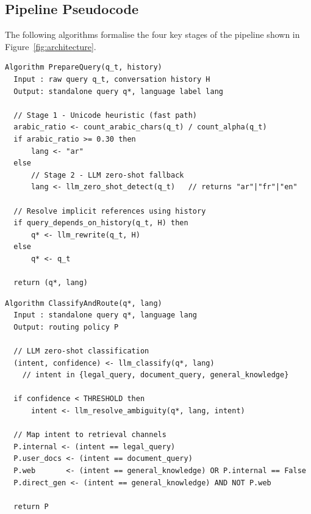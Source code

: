 \documentclass[12pt, a4paper]{article}
\begin{document}
\subsection{Pipeline Pseudocode}
\label{sec:pseudocode}

The following algorithms formalise the four key stages of the pipeline shown
in Figure~\ref{fig:architecture}.

\begin{lstlisting}[caption={Stage 1 --- Language detection and query preparation.},
                   label={lst:prep}, language={}]
Algorithm PrepareQuery(q_t, history)
  Input : raw query q_t, conversation history H
  Output: standalone query q*, language label lang

  // Stage 1 - Unicode heuristic (fast path)
  arabic_ratio <- count_arabic_chars(q_t) / count_alpha(q_t)
  if arabic_ratio >= 0.30 then
      lang <- "ar"
  else
      // Stage 2 - LLM zero-shot fallback
      lang <- llm_zero_shot_detect(q_t)   // returns "ar"|"fr"|"en"

  // Resolve implicit references using history
  if query_depends_on_history(q_t, H) then
      q* <- llm_rewrite(q_t, H)
  else
      q* <- q_t

  return (q*, lang)
\end{lstlisting}

\begin{lstlisting}[caption={Stage 2 --- Intent classification and routing.},
                   label={lst:intent}, language={}]
Algorithm ClassifyAndRoute(q*, lang)
  Input : standalone query q*, language lang
  Output: routing policy P

  // LLM zero-shot classification
  (intent, confidence) <- llm_classify(q*, lang)
    // intent in {legal_query, document_query, general_knowledge}

  if confidence < THRESHOLD then
      intent <- llm_resolve_ambiguity(q*, lang, intent)

  // Map intent to retrieval channels
  P.internal <- (intent == legal_query)
  P.user_docs <- (intent == document_query)
  P.web       <- (intent == general_knowledge) OR P.internal == False
  P.direct_gen <- (intent == general_knowledge) AND NOT P.web

  return P
\end{lstlisting}
\end{document}
